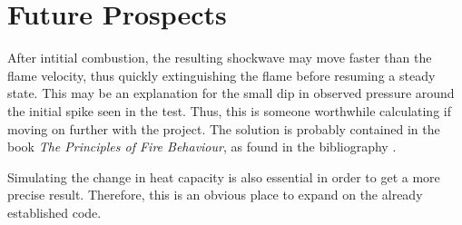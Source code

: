 \chapter{Future Prospects}

After intitial combustion, the resulting shockwave may move faster than the flame velocity, thus quickly extinguishing the flame before resuming a steady state. This may be an explanation for the small dip in observed pressure around the initial spike seen in the test. Thus, this is someone worthwhile calculating if moving on further with the project. The solution is probably contained in the book \emph{The Principles of Fire Behaviour}, as found in the bibliography \cite{principlesoffire}.

Simulating the change in heat capacity is also essential in order to get a more precise result. Therefore, this is an obvious place to expand on the already established code.
